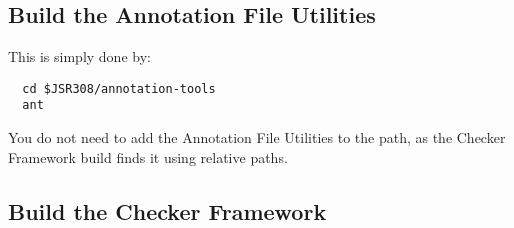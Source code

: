 


\subsection{Build the Annotation File Utilities\label{afu-building}}

This is simply done by:

\begin{Verbatim}
  cd $JSR308/annotation-tools
  ant
\end{Verbatim}

You do not need to add the Annotation File Utilities to the path, as
the Checker Framework build finds it using relative paths.


\subsection{Build the Checker Framework\label{building}}


